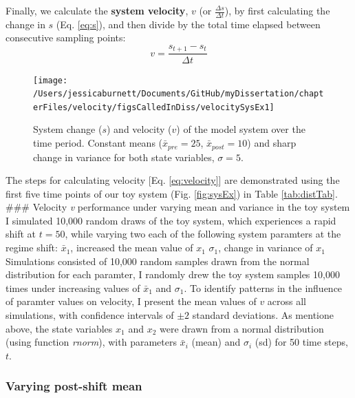 \documentclass[12pt,twoside,openany]{reedthesis}
\begin{document}
Finally, we calculate the \textbf{system velocity}, \(v\) (or \(\frac{\Delta s}{\Delta t}\)), by first calculating the change in \(s\) (Eq. \eqref{eq:s}), and then divide by the total time elapsed between consecutive sampling points:
\begin{equation}
 v = \frac {s_{t+1}-s_{t}}{\Delta t} 
\label{eq:velocity}
\end{equation}
\begin{figure}
\texttt{[image: /Users/jessicaburnett/Documents/GitHub/myDissertation/chapterFiles/velocity/figsCalledInDiss/velocitySysEx1]} \caption{System change ($s$) and velocity ($v$) of the model system over the time period. Constant means ($\bar{x}_{pre}=25$, $\bar{x}_{post}=10$) and sharp change in variance for both state variables, $\sigma =5$.}\label{fig:velocSysEx1}
\end{figure}
The steps for calculating velocity {[}Eq. \eqref{eq:velocity}{]} are demonstrated using the first five time points of our toy system (Fig. \ref{fig:sysEx}) in Table \ref{tab:distTab}.
\#\#\# Velocity \emph{v} performance under varying mean and variance in the toy system
I simulated 10,000 random draws of the toy system, which experiences a rapid shift at \(t = 50\), while varying two each of the following system paramters at the regime shift:
\(\bar{x}_1\), increased the mean value of \(x_1\)
\(\sigma_1\), change in variance of \(x_1\)
Simulations consisted of 10,000 random samples drawn from the normal distribution for each paramter, I randomly drew the toy system samples 10,000 times under increasing values of \(\bar{x}_1\) and \(\sigma_1\). To identify patterns in the influence of paramter values on velocity, I present the mean values of \(v\) across all simulations, with confidence intervals of \(\pm 2\) standard deviations. As mentione above, the state variables \(x_1\) and \(x_2\) were drawn from a normal distribution (using function \emph{rnorm}), with parameters \(\bar{x}_i\) (mean) and \(\sigma_i\) (sd) for 50 time steps, \(t\).

\hypertarget{varying-post-shift-mean}{%
\subsubsection{Varying post-shift mean}\label{varying-post-shift-mean}}
\end{document}
